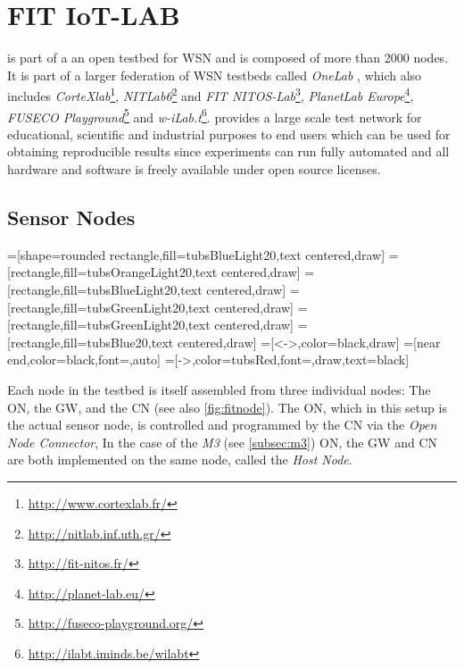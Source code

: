 \chapter{FIT IoT-LAB}
\label{chap:hardware}

\fitlab \cite{adjih2015fit} is part of a an open testbed for \ac{WSN} and is
composed of more than 2000 nodes. It is part of a larger federation of \ac{WSN}
testbeds called \emph{OneLab} \cite{baron2015onelab}, which also includes
\emph{CorteXlab}\footnote{\url{http://www.cortexlab.fr/}},
\emph{NITLab6}\footnote{\url{ http://nitlab.inf.uth.gr/}} and \emph{FIT
NITOS-Lab}\footnote{\url{http://fit-nitos.fr/}}, \emph{PlanetLab
Europe}\footnote{\url{http://planet-lab.eu/}}, \emph{FUSECO
Playground}\footnote{\url{http://fuseco-playground.org/}} and
\emph{w-iLab.t}\footnote{\url{http://ilabt.iminds.be/wilabt}}. \fitlab provides
a large scale test network for educational, scientific and industrial purposes
to end users which can be used for obtaining reproducible results since experiments
can run fully automated and all hardware and software is freely available under
open source licenses.

\section{Sensor Nodes}
\label{sec:architecture}

\usetikzlibrary{shapes,shapes.misc,positioning,circuits.ee.IEC}
=[shape=rounded rectangle,fill=tubsBlueLight20,text centered,draw]
=[rectangle,fill=tubsOrangeLight20,text centered,draw]
=[rectangle,fill=tubsBlueLight20,text centered,draw]
=[rectangle,fill=tubsGreenLight20,text centered,draw]
=[rectangle,fill=tubsGreenLight20,text centered,draw]
  =[rectangle,fill=tubsBlue20,text centered,draw]
=[<->,color=black,draw]
=[near end,color=black,font=\tiny,auto]
=[->,color=tubsRed,font=\tiny,draw,text=black]

Each node in the testbed is itself assembled from three individual nodes: The
\ac{ON}, the \ac{GW}, and the \ac{CN} (see also \autoref{fig:fitnode}). The
\ac{ON}, which in this setup is the actual sensor node, is controlled and
programmed by the \ac{CN} via the \emph{Open Node Connector}, In the case of the
\emph{M3} (see \autoref{subsec:m3}) \ac{ON}, the \ac{GW} and \ac{CN} are both
implemented on the same node, called the \emph{Host Node}.


